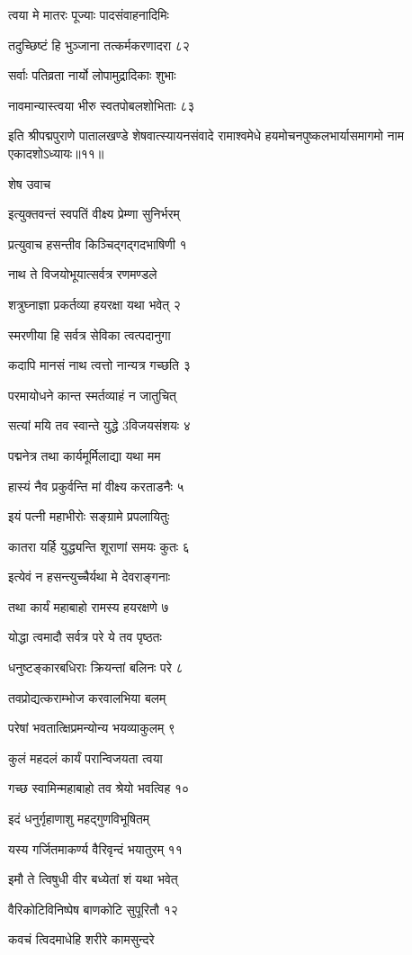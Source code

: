 त्वया मे मातरः पूज्याः पादसंवाहनादिमिः

तदुच्छिष्टं हि भुञ्जाना तत्कर्मकरणादरा ८२

सर्वाः पतिव्रता नार्यो लोपामुद्रादिकाः शुभाः

नावमान्यास्त्वया भीरु स्वतपोबलशोभिताः ८३

इति श्रीपद्मपुराणे पातालखण्डे शेषवात्स्यायनसंवादे रामाश्वमेधे हयमोचनपुष्कलभार्यासमागमो नाम एकादशोऽध्यायः॥११॥


शेष उवाच

इत्युक्तवन्तं स्वपतिं वीक्ष्य प्रेम्णा सुनिर्भरम्

प्रत्युवाच हसन्तीव किञ्चिद्गद्गदभाषिणी १

नाथ ते विजयोभूयात्सर्वत्र रणमण्डले

शत्रुघ्नाज्ञा प्रकर्तव्या हयरक्षा यथा भवेत् २

स्मरणीया हि सर्वत्र सेविका त्वत्पदानुगा

कदापि मानसं नाथ त्वत्तो नान्यत्र गच्छति ३

परमायोधने कान्त स्मर्तव्याहं न जातुचित्

सत्यां मयि तव स्वान्ते युद्धे 3विजयसंशयः ४

पद्मनेत्र तथा कार्यमूर्मिलाद्या यथा मम

हास्यं नैव प्रकुर्वन्ति मां वीक्ष्य करताडनैः ५

इयं पत्नी महाभीरोः सङ्ग्रामे प्रपलायितुः

कातरा यर्हि युद्ध्यन्ति शूराणां समयः कुतः ६

इत्येवं न हसन्त्युच्चैर्यथा मे देवराङ्गनाः

तथा कार्यं महाबाहो रामस्य हयरक्षणे ७

योद्धा त्वमादौ सर्वत्र परे ये तव पृष्ठतः

धनुष्टङ्कारबधिराः क्रियन्तां बलिनः परे ८

तवप्रोद्यत्कराम्भोज करवालभिया बलम्

परेषां भवतात्क्षिप्रमन्योन्य भयव्याकुलम् ९

कुलं महदलं कार्यं परान्विजयता त्वया

गच्छ स्वामिन्महाबाहो तव श्रेयो भवत्विह १०

इदं धनुर्गृहाणाशु महद्गुणविभूषितम्

यस्य गर्जितमाकर्ण्य वैरिवृन्दं भयातुरम् ११

इमौ ते त्विषुधी वीर बध्येतां शं यथा भवेत्

वैरिकोटिविनिष्पेष बाणकोटि सुपूरितौ १२

कवचं त्विदमाधेहि शरीरे कामसुन्दरे

